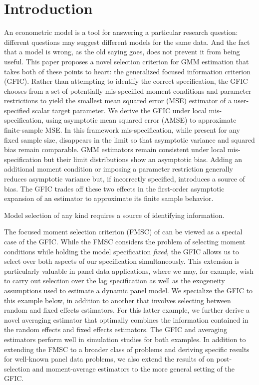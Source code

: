 \section{Introduction}


An econometric model is a tool for answering a particular research question: different questions may suggest different models for the same data. 
And the fact that a model is wrong, as the old saying goes, does not prevent it from being useful. 
This paper proposes a novel selection criterion for GMM estimation that takes both of these points to heart: the generalized focused information criterion (GFIC). 
Rather than attempting to identify the correct specification, the GFIC chooses from a set of potentially mis-specified moment conditions and parameter restrictions to yield the smallest mean squared error (MSE) estimator of a user-specified scalar target parameter. 
We derive the GFIC under local mis-specification, using asymptotic mean squared error (AMSE) to approximate finite-sample MSE. 
In this framework mis-specification, while present for any fixed sample size, disappears in the limit so that asymptotic variance and squared bias remain comparable. 
GMM estimators remain consistent under local mis-specification but their limit distributions show an asymptotic bias. 
Adding an additional moment condition or imposing a parameter restriction generally reduces asymptotic variance but, if incorrectly specified, introduces a source of bias.
The GFIC trades off these two effects in the first-order asymptotic expansion of an estimator to approximate its finite sample behavior.

Model selection of any kind requires a source of identifying information.

The focused moment selection criterion (FMSC) of \cite{DiTraglia2012} can be viewed as a special case of the GFIC. 
While the FMSC considers the problem of selecting moment conditions while holding the model specification \emph{fixed}, the GFIC allows us to select over both aspects of our specification simultaneously.
This extension is particularly valuable in panel data applications, where we may, for example, wish to carry out selection over the lag specification as well as the exogeneity assumptions used to estimate a dynamic panel model.
We specialize the GFIC to this example below, in addition to another that involves selecting between random and fixed effects estimators.
For this latter example, we further derive a novel averaging estimator that optimally combines the information contained in the random effects and fixed effects estimators.
The GFIC and averaging estimators perform well in simulation studies for both examples.
In addition to extending the FMSC to a broader class of problems and deriving specific results for well-known panel data problems, we also extend the results of \cite{DiTraglia2012} on post-selection and moment-average estimators to the more general setting of the GFIC.  

